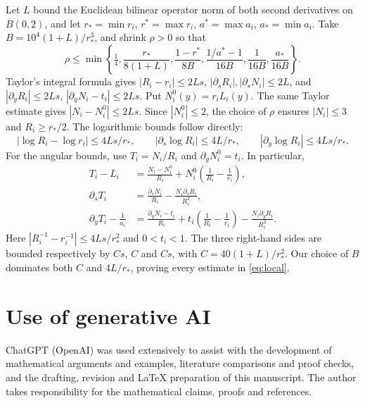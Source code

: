 \documentclass[11pt]{amsart}
\theoremstyle{definition}
\theoremstyle{remark}
\numberwithin{equation}{section}
\begin{document}
Let
\(L\) bound the Euclidean bilinear operator norm of both second
derivatives on \(\overline B(0,2)\), and let
\(r_*=\min r_i\), \(r^*=\max r_i\), \(a^*=\max a_i\),
\(a_*=\min a_i\). Take
\(B=10^4(1+L)/r_*^3\), and shrink \(\rho>0\) so that
\begin{equation}
\rho\le\min\left\{\tfrac14,\frac{r_*}{8(1+L)},
  \frac{1-r^*}{8B},\frac{1/a^*-1}{16B},
  \frac1{16B},\frac{a_*}{16B}\right\}.                        \label{eq:rho}
\end{equation}
Taylor's integral formula gives \(|R_i-r_i|\le2Ls\),
\(|\partial_sR_i|,|\partial_sN_i|\le2L\), and
\(|\partial_yR_i|\le2Ls\),
\(|\partial_yN_i-t_i|\le2Ls\).
Put $N_i^0(y)=r_iL_i(y)$. The same Taylor estimate gives
$|N_i-N_i^0|\le2Ls$. Since $|N_i^0|\le2$, the choice of
$\rho$ ensures $|N_i|\le3$ and $R_i\ge r_*/2$.
The logarithmic bounds follow directly:
\[
|\log R_i-\log r_i|\le4Ls/r_*,\qquad
|\partial_s\log R_i|\le4L/r_*,\qquad
|\partial_y\log R_i|\le4Ls/r_*.
\]
For the angular bounds, use $T_i=N_i/R_i$ and
$\partial_yN_i^0=t_i$. In particular,
\[
\begin{split}
T_i-L_i&=\frac{N_i-N_i^0}{R_i}
              +N_i^0\left(\frac1{R_i}-\frac1{r_i}\right),\\
\partial_sT_i&=\frac{\partial_sN_i}{R_i}
                         -\frac{N_i\partial_sR_i}{R_i^2},\\
\partial_yT_i-\frac1{a_i}
 &=\frac{\partial_yN_i-t_i}{R_i}
       +t_i\left(\frac1{R_i}-\frac1{r_i}\right)
                         -\frac{N_i\partial_yR_i}{R_i^2}.
\end{split}
\]
Here $|R_i^{-1}-r_i^{-1}|\le4Ls/r_*^2$ and $0<t_i<1$.
The three right-hand sides are bounded respectively by $Cs$, $C$
and $Cs$, with $C=40(1+L)/r_*^2$. Our choice of $B$ dominates
both $C$ and $4L/r_*$, proving every estimate in \eqref{eq:local}.


\section*{Use of generative AI}
ChatGPT (OpenAI) was used extensively to assist with the development
of mathematical arguments and examples, literature comparisons and
proof checks, and the drafting, revision and \LaTeX{} preparation
of this manuscript. The author takes responsibility for the
mathematical claims, proofs and references.
\end{document}
